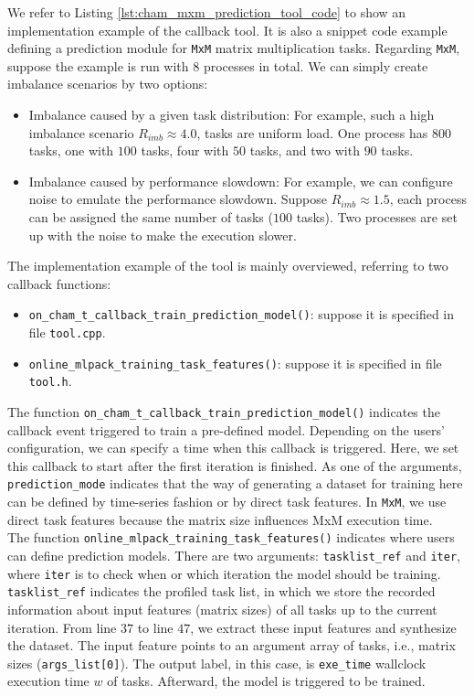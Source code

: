 We refer to Listing \ref{lst:cham_mxm_prediction_tool_code} to show an implementation example of the callback tool. It is also a snippet code example defining a prediction module for \texttt{MxM} matrix multiplication tasks. Regarding \texttt{MxM}, suppose the example is run with $8$ processes in total. We can simply create imbalance scenarios by two options:
\begin{itemize}
	\item Imbalance caused by a given task distribution: For example, such a high imbalance scenario $R_{imb} \approx 4.0$, tasks are uniform load. One process has $800$ tasks, one with $100$ tasks, four with $50$ tasks, and two with $90$ tasks.
	\item Imbalance caused by performance slowdown: For example, we can configure noise to emulate the performance slowdown. Suppose $R_{imb} \approx 1.5$, each process can be assigned the same number of tasks ($100$ tasks). Two processes are set up with the noise to make the execution slower.
\end{itemize}

The implementation example of the tool is mainly overviewed, referring to two callback functions:
\begin{itemize}
	\item \texttt{on\_cham\_t\_callback\_train\_prediction\_model()}: suppose it is specified in file \texttt{tool.cpp}.
	\item \texttt{online\_mlpack\_training\_task\_features()}: suppose it is specified in file \texttt{tool.h}.
\end{itemize}

The function \texttt{on\_cham\_t\_callback\_train\_prediction\_model()} indicates the callback event triggered to train a pre-defined model. Depending on the users' configuration, we can specify a time when this callback is triggered. Here, we set this callback to start after the first iteration is finished. As one of the arguments, \texttt{prediction\_mode} indicates that the way of generating a dataset for training here can be defined by time-series fashion or by direct task features. In \texttt{MxM}, we use direct task features because the matrix size influences MxM execution time.\\

The function \texttt{online\_mlpack\_training\_task\_features()} indicates where users can define prediction models. There are two arguments: \texttt{tasklist\_ref} and \texttt{iter}, where \texttt{iter} is to check when or which iteration the model should be training. \texttt{tasklist\_ref} indicates the profiled task list, in which we store the recorded information about input features (matrix sizes) of all tasks up to the current iteration. From line $37$ to line $47$, we extract these input features and synthesize the dataset. The input feature points to an argument array of tasks, i.e., matrix sizes (\texttt{args\_list[0]}). The output label, in this case, is \texttt{exe\_time}  wallclock execution time $w$ of tasks. Afterward, the model is triggered to be trained. \\

